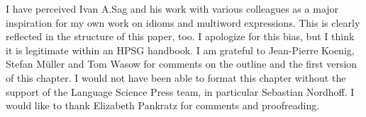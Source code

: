 \documentclass[output=paper
 	        ,biblatex
                ,babelshorthands
                ,newtxmath
                ,draftmode
                ,colorlinks, citecolor=brown
]{langscibook}
\begin{document}
I have perceived Ivan A.\@ Sag and his work with various colleagues as a major inspiration for my own work on idioms and multiword expressions. 
This is clearly reflected in the structure of this paper, too. 
I apologize for this bias, but I think it is legitimate within an HPSG handbook.
%
I am grateful to Jean-Pierre Koenig, Stefan Müller and Tom Wasow for comments on the outline and the first version of this chapter. 
%
I would not have been able to format this chapter without the support of the Language Science Press team, in particular Sebastian Nordhoff.
%
I would like to thank Elizabeth Pankratz for comments and proofreading.

{\sloppy
\printbibliography[heading=subbibliography,notkeyword=this] }
\end{document}
